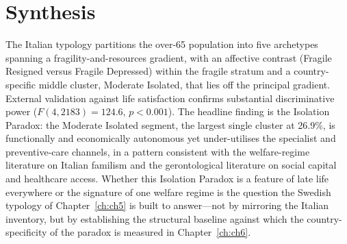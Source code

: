 \section{Synthesis}
\label{sec:ch4-synthesis}

The Italian typology partitions the over-65 population into five archetypes spanning a fragility-and-resources gradient, with an affective contrast (Fragile Resigned versus Fragile Depressed) within the fragile stratum and a country-specific middle cluster, Moderate Isolated, that lies off the principal gradient. External validation against life satisfaction confirms substantial discriminative power ($F(4, 2183) = 124.6$, $p < 0.001$). The headline finding is the Isolation Paradox: the Moderate Isolated segment, the largest single cluster at 26.9\%, is functionally and economically autonomous yet under-utilises the specialist and preventive-care channels, in a pattern consistent with the welfare-regime literature on Italian familism and the gerontological literature on social capital and healthcare access. Whether this Isolation Paradox is a feature of late life everywhere or the signature of one welfare regime is the question the Swedish typology of Chapter~\ref{ch:ch5} is built to answer---not by mirroring the Italian inventory, but by establishing the structural baseline against which the country-specificity of the paradox is measured in Chapter~\ref{ch:ch6}.
